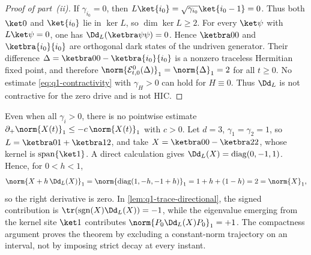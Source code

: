 \documentclass[class=article,11pt,a4paper,crop=false]{standalone}
\begin{document}
\begin{proof}[Proof of part~\textup{(ii)}]
	If $\gamma_{i_0}=0$, then
	$L\ket{i_0}=\sqrt{\gamma_{i_0}}\ket{i_0-1}=0$. Thus both $\ket0$ and
	$\ket{i_0}$ lie in $\ker L$, so $\dim\ker L\ge2$. For every $\ket\psi$ with
	$L\ket\psi=0$, one has $\Dd_L(\ketbra\psi\psi)=0$. Hence
	$\ketbra00$ and $\ketbra{i_0}{i_0}$ are orthogonal dark states of the
	undriven generator. Their difference
	$\Delta=\ketbra00-\ketbra{i_0}{i_0}$ is a nonzero traceless Hermitian fixed
	point, and therefore
	$\norm{\mathcal E^0_{t,0}(\Delta)}_1=\norm{\Delta}_1=2$ for all $t\ge0$.
	No estimate \eqref{eq:q1-contractivity} with $\gamma_H>0$ can hold for
	$H\equiv0$. Thus $\Dd_L$ is not contractive for the zero drive and is not
	HIC.
\end{proof}

\begin{remark}[Why a pointwise $C=1$ differential estimate fails]
	\label{rem:q1-pointwise}
	Even when all $\gamma_i>0$, there is no pointwise estimate
	$\partial_+\norm{X(t)}_1\le-c\,\norm{X(t)}_1$ with $c>0$. Let $d=3$,
	$\gamma_1=\gamma_2=1$, so
	$L=\ketbra01+\ketbra12$, and take
	$X=\ketbra00-\ketbra22$, whose kernel is
	$\operatorname{span}\{\ket1\}$. A direct calculation gives
	$\Dd_L(X)=\operatorname{diag}(0,-1,1)$. Hence, for $0<h<1$,
	\begin{equation}
		\norm{X+h\,\Dd_L(X)}_1
		=\norm{\operatorname{diag}(1,-h,-1+h)}_1
		=1+h+(1-h)=2=\norm{X}_1,
	\end{equation}
	so the right derivative is zero. In
	\cref{lem:q1-trace-directional}, the signed contribution is
	$\tr(\operatorname{sgn}(X)\Dd_L(X))=-1$, while the eigenvalue emerging from
	the kernel site $\ket1$ contributes
	$\norm{P_0\Dd_L(X)P_0}_1=+1$. The compactness argument proves the theorem by
	excluding a constant-norm trajectory on an interval, not by imposing strict
	decay at every instant.
\end{remark}
\end{document}

